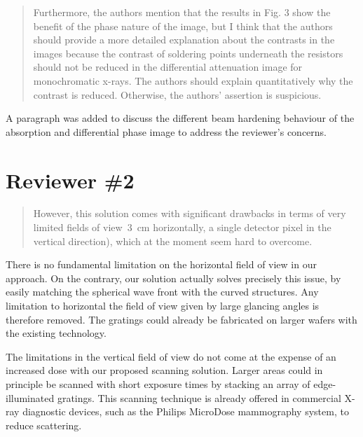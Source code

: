 \documentclass[a4paper,english]{scrartcl}
\begin{document}
\begin{quote}
    Furthermore, the authors mention that the results in Fig. 3 show the benefit of the phase nature of the image, but I think that the authors should provide a more detailed explanation about the contrasts in the images because the contrast of soldering points underneath the resistors should not be reduced in the differential attenuation image for monochromatic x-rays. The authors should explain quantitatively why the contrast is reduced. Otherwise, the authors' assertion is suspicious.
\end{quote}
A paragraph was added to discuss the different beam hardening behaviour of
the absorption and differential phase image to address the reviewer's
concerns.

\section*{Reviewer \#2}
\begin{quote}
    However, this solution comes with significant drawbacks in terms of very
    limited fields of view~\SI{3}{\centi\metre} horizontally, a single detector pixel in the vertical direction), which at the moment seem hard to overcome.
\end{quote}
There is no fundamental limitation on the horizontal field of view in our
approach. On the contrary, our solution actually solves precisely this
issue, by easily matching the spherical wave front with the curved
structures. Any limitation to horizontal the field of view given by large glancing
angles is therefore removed. The gratings could already be fabricated on
larger wafers with the existing technology.

The limitations in the vertical field of view do not come at the expense of
an increased dose with our proposed scanning solution. Larger areas could in
principle be scanned with short exposure times by stacking an array of
edge-illuminated gratings. This scanning technique is already offered in commercial X-ray
diagnostic devices, such as the Philips MicroDose mammography system, to
reduce scattering.
\end{document}
